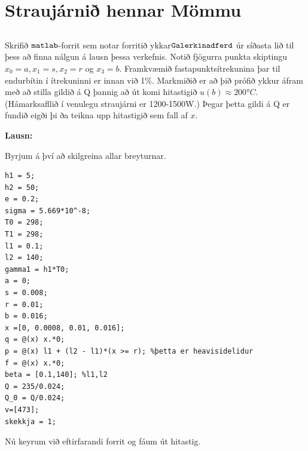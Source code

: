 \documentclass[11pt,a4paper,titlepage]{article}
\begin{document}
\section{Straujárnið hennar Mömmu}



\subsection{}

Skrifið $\verb|matlab|$-forrit sem notar forritið ykkar$ \verb|Galerkinadferd| $ úr síðasta lið til þess að finna nálgun á lausn þessa verkefnis. Notið fjögurra punkta skiptingu  $x_{0}=a, x_{1}=s, x_{2}=r$ og $x_{3}=b$.  Framkvæmið fastapunktsítrekunina þar til endurbítin í ítrekuninni er innan við 1\%.  Markmiðið er að þið prófið ykkur áfram með að stilla gildið á Q þannig að út komi hitastigið $u(b)\approx 200°C$. (Hámarksafllið í venulegu straujárni er 1200-1500W.) Þegar þetta gildi á Q er fundið eigði þi ða teikna upp hitastigið sem fall af $x$. 

\par
\textbf{Lausn:}\par
Byrjum á því að skilgreina allar breyturnar.
\begin{verbatim}
h1 = 5;
h2 = 50;
e = 0.2;
sigma = 5.669*10^-8;
T0 = 298;
T1 = 298;
l1 = 0.1;
l2 = 140;
gamma1 = h1*T0;
a = 0;
s = 0.008;
r = 0.01;
b = 0.016;
x =[0, 0.0008, 0.01, 0.016];
q = @(x) x.*0;
p = @(x) l1 + (l2 - l1)*(x >= r); %þetta er heavisidelidur
f = @(x) x.*0;
beta = [0.1,140]; %l1,l2
Q = 235/0.024;
Q_0 = Q/0.024;
v=[473];
skekkja = 1;
\end{verbatim}
 Nú keyrum við eftirfarandi forrit og fáum út hitastig. 
 
\end{document}
